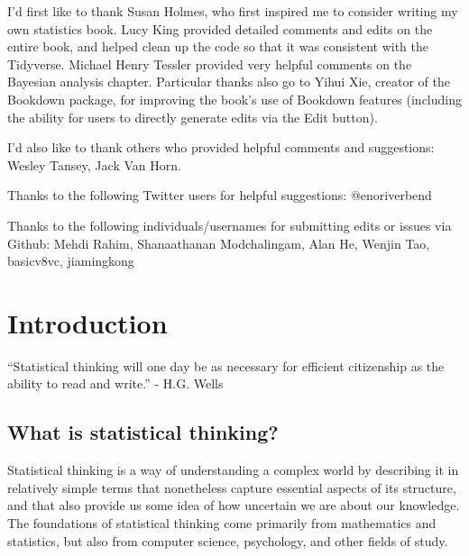 \documentclass[]{book}
\theoremstyle{definition}
\theoremstyle{definition}
\theoremstyle{definition}
\theoremstyle{remark}
\begin{document}
I'd first like to thank Susan Holmes, who first inspired me to consider
writing my own statistics book. Lucy King provided detailed comments and
edits on the entire book, and helped clean up the code so that it was
consistent with the Tidyverse. Michael Henry Tessler provided very
helpful comments on the Bayesian analysis chapter. Particular thanks
also go to Yihui Xie, creator of the Bookdown package, for improving the
book's use of Bookdown features (including the ability for users to
directly generate edits via the Edit button).

I'd also like to thank others who provided helpful comments and
suggestions: Wesley Tansey, Jack Van Horn.

Thanks to the following Twitter users for helpful suggestions:
@enoriverbend

Thanks to the following individuals/usernames for submitting edits or
issues via Github: Mehdi Rahim, Shanaathanan Modchalingam, Alan He,
Wenjin Tao, basicv8vc, jiamingkong

\chapter{Introduction}\label{introduction}

``Statistical thinking will one day be as necessary for efficient
citizenship as the ability to read and write.'' - H.G. Wells

\section{What is statistical
thinking?}\label{what-is-statistical-thinking}

Statistical thinking is a way of understanding a complex world by
describing it in relatively simple terms that nonetheless capture
essential aspects of its structure, and that also provide us some idea
of how uncertain we are about our knowledge. The foundations of
statistical thinking come primarily from mathematics and statistics, but
also from computer science, psychology, and other fields of study.
\end{document}

